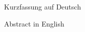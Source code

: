 \begin{abstractDE}
Kurzfassung auf Deutsch
\end{abstractDE}

\vfill

\begin{abstractEN}
Abstract in English
\end{abstractEN}

\vfill